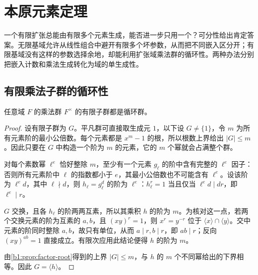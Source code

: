 
\section{本原元素定理}
\label{b1:sec:1604}


%
%
%

一个有限扩张总能由有限多个元素生成，能否进一步只用一个？可分性给出肯定答案。无限基域允许从线性组合中避开有限多个坏参数，从而把不同嵌入区分开；有限基域没有这样的参数选择余地，却能利用扩张域乘法群的循环性。两种办法分别把嵌入计数和乘法生成转化为域的单生成性。

\subsection{有限乘法子群的循环性}
\label{b1:subsec:1604:04}

\begin{lemma}\label{b1:lem:finite-multiplicative-cyclic}
	任意域 \(F\) 的乘法群 \(F^\times\) 的有限子群都是循环群。
\end{lemma}
\begin{proof}
	设有限子群为 \(G\)。平凡群可直接取生成元 \(1\)，以下设 \(G\ne\{1\}\)，令 \(m\) 为所有元素阶的最小公倍数。每个元素都是 \(x^m-1\) 的根，所以根数上界给出 \(\lvert G\rvert\le m\)。因此只要在 \(G\) 中构造一个阶为 \(m\) 的元素，它的 \(m\) 个幂就会占满整个群。

	对每个素数幂 \(\ell^e\) 恰好整除 \(m\)，至少有一个元素 \(g_\ell\) 的阶中含有完整的 \(\ell^e\) 因子：否则所有元素阶中 \(\ell\) 的指数都小于 \(e\)，其最小公倍数也不可能含有 \(\ell^e\)。设该阶为 \(\ell^e d\)，其中 \(\ell\nmid d\)，则 \(h_\ell=g_\ell^d\) 的阶为 \(\ell^e\)：\(h_\ell^r=1\) 当且仅当 \(\ell^e d\mid dr\)，即 \(\ell^e\mid r\)。

	\(G\) 交换，且各 \(h_\ell\) 的阶两两互素，所以其乘积 \(h\) 的阶为 \(m\)。为核对这一点，若两个交换元素的阶为互素的 \(a,b\)，且 \((xy)^r=1\)，则 \(x^r=y^{-r}\) 位于 \(\langle x\rangle\cap\langle y\rangle\)。交中元素的阶同时整除 \(a,b\)，故只有单位，从而 \(a\mid r,b\mid r\)，即 \(ab\mid r\)；反向 \((xy)^{ab}=1\) 直接成立。有限次应用此结论便得 \(h\) 的阶为 \(m\)。

	由\cref{b1:prop:factor-root}得到的上界 \(\lvert G\rvert\le m\)，与 \(h\) 的 \(m\) 个不同幂给出的下界相等。因此 \(G=\langle h\rangle\)。
\end{proof}

